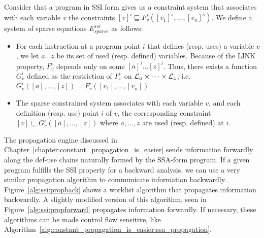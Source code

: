 \begin{definition}
\label{def:ssi_eq}
Consider that a program in SSI form gives us a constraint system that associates with each variable $v$ the constraints $[v]^i \sqsubseteq  F_v^s([v_1]^s, \dots, [v_n]^s)$. We define a system of sparse equations $E^{ssi}_{sparse}$ as follows:

\begin{itemize}

\item For each instruction at a program point $i$ that defines (resp. uses) a variable $v$, we let $a \dots z$ be its set of used (resp. defined) variables. Because of the LINK property, $F^i_v$ depends only on some $[a]^i \dots [z]^i$.
Thus, there exists a function $G^i_v$ defined as the restriction of $F^i_v$ on ${\cal L}_a\times \dots \times{\cal L}_z$, i.e. $G^i_v([a], \dots, [z]) = F^i_v([v_1],\dots, [v_n])$.

\item The sparse constrained system associates with each variable $v$, and each definition (resp. use) point $i$ of $v$, the corresponding constraint $[v]  \sqsubseteq G_v^i([a], \ldots, [z])$ where $a,\dots, z$ are used (resp. defined) at $i$.
\end{itemize}

\end{definition}

The propagation engine discussed in Chapter~\ref{chapter:constant_propagation_is_easier} sends information forwardly along the def-use chains naturally formed by the SSA-form program.
If a given program fulfills the SSI property for a backward analysis, we can use a very similar propagation algorithm to communicate information backwardly.
Figure~\ref{alg:ssi:propback} shows a worklist algorithm that propagates information backwardly.
A slightly modified version of this algorithm, seen in Figure~\ref{alg:ssi:propforward} propagates information forwardly.
If necessary, these algorithms can be made control flow sensitive, like Algorithm~\ref{alg:constant_propagation_is_easier:ssa_propagation}. 


\def\1{\qquad}
\def\2{\1\1}
\def\3{\2\1}
\def\4{\2\2}
\def\5{\3\2}
\def\6{\4\2}
\def\7{\5\2}
\def\8{\6\2}
\def\9{\7\2}
\def\If{{\sf  if }}
\def\Let{{\sf  let }}
\def\Then{{\sf  then }}
\def\Else{{\sf  else}}
\def\Foreach{{\sf foreach }}
\def\For{{\sf for }}
\def\While{{\sf while }}


